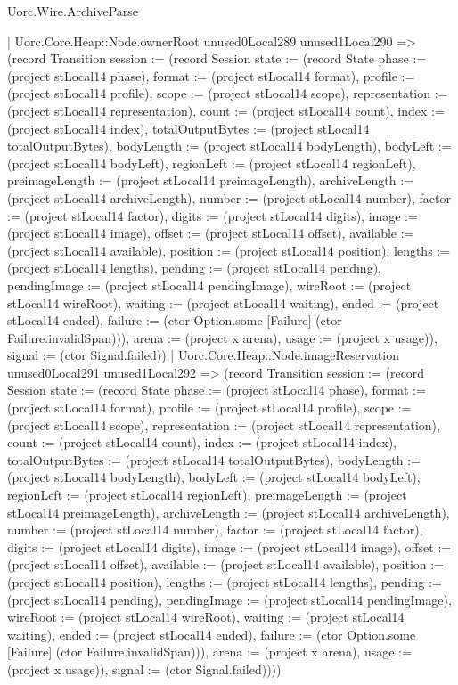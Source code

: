 \begin{lexlean}{Uorc.Wire.ArchiveParse}
\begin{semanticmodule}
{            | Uorc.Core.Heap::Node.ownerRoot unused0Local289 unused1Local290 => (record Transition {session := (record Session {state := (record State {phase := (project stLocal14 phase), format := (project stLocal14 format), profile := (project stLocal14 profile), scope := (project stLocal14 scope), representation := (project stLocal14 representation), count := (project stLocal14 count), index := (project stLocal14 index), totalOutputBytes := (project stLocal14 totalOutputBytes), bodyLength := (project stLocal14 bodyLength), bodyLeft := (project stLocal14 bodyLeft), regionLeft := (project stLocal14 regionLeft), preimageLength := (project stLocal14 preimageLength), archiveLength := (project stLocal14 archiveLength), number := (project stLocal14 number), factor := (project stLocal14 factor), digits := (project stLocal14 digits), image := (project stLocal14 image), offset := (project stLocal14 offset), available := (project stLocal14 available), position := (project stLocal14 position), lengths := (project stLocal14 lengths), pending := (project stLocal14 pending), pendingImage := (project stLocal14 pendingImage), wireRoot := (project stLocal14 wireRoot), waiting := (project stLocal14 waiting), ended := (project stLocal14 ended), failure := (ctor Option.some [Failure] (ctor Failure.invalidSpan))}), arena := (project x arena), usage := (project x usage)}), signal := (ctor Signal.failed)})
            | Uorc.Core.Heap::Node.imageReservation unused0Local291 unused1Local292 => (record Transition {session := (record Session {state := (record State {phase := (project stLocal14 phase), format := (project stLocal14 format), profile := (project stLocal14 profile), scope := (project stLocal14 scope), representation := (project stLocal14 representation), count := (project stLocal14 count), index := (project stLocal14 index), totalOutputBytes := (project stLocal14 totalOutputBytes), bodyLength := (project stLocal14 bodyLength), bodyLeft := (project stLocal14 bodyLeft), regionLeft := (project stLocal14 regionLeft), preimageLength := (project stLocal14 preimageLength), archiveLength := (project stLocal14 archiveLength), number := (project stLocal14 number), factor := (project stLocal14 factor), digits := (project stLocal14 digits), image := (project stLocal14 image), offset := (project stLocal14 offset), available := (project stLocal14 available), position := (project stLocal14 position), lengths := (project stLocal14 lengths), pending := (project stLocal14 pending), pendingImage := (project stLocal14 pendingImage), wireRoot := (project stLocal14 wireRoot), waiting := (project stLocal14 waiting), ended := (project stLocal14 ended), failure := (ctor Option.some [Failure] (ctor Failure.invalidSpan))}), arena := (project x arena), usage := (project x usage)}), signal := (ctor Signal.failed)})))
}
\end{semanticmodule}
\end{lexlean}

